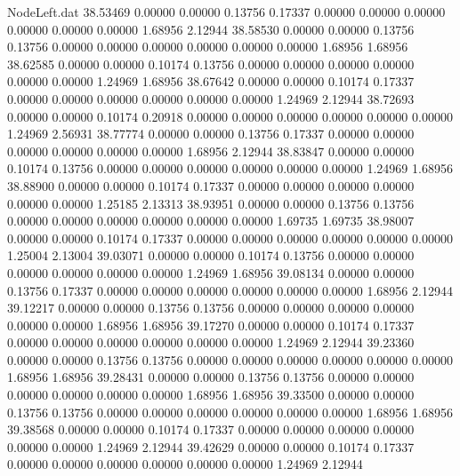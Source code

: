 \begin{filecontents}{NodeLeft.dat}
  38.53469    0.00000    0.00000     0.13756    0.17337    0.00000    0.00000    0.00000    0.00000    0.00000    0.00000    1.68956    2.12944
  38.58530    0.00000    0.00000     0.13756    0.13756    0.00000    0.00000    0.00000    0.00000    0.00000    0.00000    1.68956    1.68956
  38.62585    0.00000    0.00000     0.10174    0.13756    0.00000    0.00000    0.00000    0.00000    0.00000    0.00000    1.24969    1.68956
  38.67642    0.00000    0.00000     0.10174    0.17337    0.00000    0.00000    0.00000    0.00000    0.00000    0.00000    1.24969    2.12944
  38.72693    0.00000    0.00000     0.10174    0.20918    0.00000    0.00000    0.00000    0.00000    0.00000    0.00000    1.24969    2.56931
  38.77774    0.00000    0.00000     0.13756    0.17337    0.00000    0.00000    0.00000    0.00000    0.00000    0.00000    1.68956    2.12944
  38.83847    0.00000    0.00000     0.10174    0.13756    0.00000    0.00000    0.00000    0.00000    0.00000    0.00000    1.24969    1.68956
  38.88900    0.00000    0.00000     0.10174    0.17337    0.00000    0.00000    0.00000    0.00000    0.00000    0.00000    1.25185    2.13313
  38.93951    0.00000    0.00000     0.13756    0.13756    0.00000    0.00000    0.00000    0.00000    0.00000    0.00000    1.69735    1.69735
  38.98007    0.00000    0.00000     0.10174    0.17337    0.00000    0.00000    0.00000    0.00000    0.00000    0.00000    1.25004    2.13004
  39.03071    0.00000    0.00000     0.10174    0.13756    0.00000    0.00000    0.00000    0.00000    0.00000    0.00000    1.24969    1.68956
  39.08134    0.00000    0.00000     0.13756    0.17337    0.00000    0.00000    0.00000    0.00000    0.00000    0.00000    1.68956    2.12944
  39.12217    0.00000    0.00000     0.13756    0.13756    0.00000    0.00000    0.00000    0.00000    0.00000    0.00000    1.68956    1.68956
  39.17270    0.00000    0.00000     0.10174    0.17337    0.00000    0.00000    0.00000    0.00000    0.00000    0.00000    1.24969    2.12944
  39.23360    0.00000    0.00000     0.13756    0.13756    0.00000    0.00000    0.00000    0.00000    0.00000    0.00000    1.68956    1.68956
  39.28431    0.00000    0.00000     0.13756    0.13756    0.00000    0.00000    0.00000    0.00000    0.00000    0.00000    1.68956    1.68956
  39.33500    0.00000    0.00000     0.13756    0.13756    0.00000    0.00000    0.00000    0.00000    0.00000    0.00000    1.68956    1.68956
  39.38568    0.00000    0.00000     0.10174    0.17337    0.00000    0.00000    0.00000    0.00000    0.00000    0.00000    1.24969    2.12944
  39.42629    0.00000    0.00000     0.10174    0.17337    0.00000    0.00000    0.00000    0.00000    0.00000    0.00000    1.24969    2.12944

\end{filecontents}
